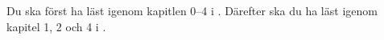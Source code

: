 Du ska först ha läst igenom kapitlen 0--4 i \cite{Brookshear2012csa}.
Därefter ska du ha läst igenom kapitel 1, 2 och 
4 i  \cite{Oetiker2011lshort}.
